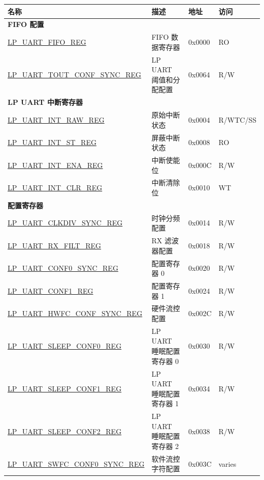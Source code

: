 \begin{longtable}{ | p{6.8cm} | p{5.7cm} | p{1.3cm} | p{1.7cm} | }
\hline\rowcolor{lightgray}
名称 & 描述 &  地址 & 访问 \\ \hline
\endhead
\multicolumn{4}{|l|}{\textbf{FIFO 配置}} \\ \hline
\hyperref[regdesc:LPUARTFIFOREG]{LP\_UART\_FIFO\_REG} & FIFO 数据寄存器 & 0x0000 & RO \\ \hline
\hyperref[regdesc:LPUARTTOUTCONFSYNCREG]{LP\_UART\_TOUT\_CONF\_SYNC\_REG} & LP UART 阈值和分配配置 & 0x0064 & R/W \\ \hline
\multicolumn{4}{|l|}{\textbf{LP UART 中断寄存器}} \\ \hline
\hyperref[regdesc:LPUARTINTRAWREG]{LP\_UART\_INT\_RAW\_REG} & 原始中断状态 & 0x0004 & R/WTC/SS \\ \hline
\hyperref[regdesc:LPUARTINTSTREG]{LP\_UART\_INT\_ST\_REG} & 屏蔽中断状态 & 0x0008 & RO \\ \hline
\hyperref[regdesc:LPUARTINTENAREG]{LP\_UART\_INT\_ENA\_REG} & 中断使能位 & 0x000C & R/W \\ \hline
\hyperref[regdesc:LPUARTINTCLRREG]{LP\_UART\_INT\_CLR\_REG} & 中断清除位 & 0x0010 & WT \\ \hline
\multicolumn{4}{|l|}{\textbf{配置寄存器}} \\ \hline
\hyperref[regdesc:LPUARTCLKDIVSYNCREG]{LP\_UART\_CLKDIV\_SYNC\_REG} & 时钟分频配置 & 0x0014 & R/W \\ \hline
\hyperref[regdesc:LPUARTRXFILTREG]{LP\_UART\_RX\_FILT\_REG} & RX 滤波器配置 & 0x0018 & R/W \\ \hline
\hyperref[regdesc:LPUARTCONF0SYNCREG]{LP\_UART\_CONF0\_SYNC\_REG} & 配置寄存器 0 & 0x0020 & R/W \\ \hline
\hyperref[regdesc:LPUARTCONF1REG]{LP\_UART\_CONF1\_REG} & 配置寄存器 1 & 0x0024 & R/W \\ \hline
\hyperref[regdesc:LPUARTHWFCCONFSYNCREG]{LP\_UART\_HWFC\_CONF\_SYNC\_REG} & 硬件流控配置 & 0x002C & R/W \\ \hline
\hyperref[regdesc:LPUARTSLEEPCONF0REG]{LP\_UART\_SLEEP\_CONF0\_REG} & LP UART 睡眠配置寄存器 0 & 0x0030 & R/W \\ \hline
\hyperref[regdesc:LPUARTSLEEPCONF1REG]{LP\_UART\_SLEEP\_CONF1\_REG} & LP UART 睡眠配置寄存器 1 & 0x0034 & R/W \\ \hline
\hyperref[regdesc:LPUARTSLEEPCONF2REG]{LP\_UART\_SLEEP\_CONF2\_REG} & LP UART 睡眠配置寄存器 2 & 0x0038 & R/W \\ \hline
\hyperref[regdesc:LPUARTSWFCCONF0SYNCREG]{LP\_UART\_SWFC\_CONF0\_SYNC\_REG} & 软件流控字符配置 & 0x003C & varies \\ \hline

\end{longtable}

